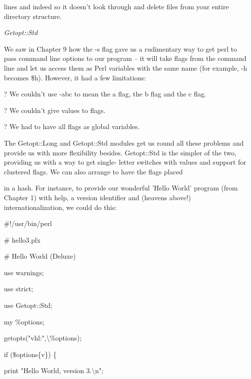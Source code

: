 \documentclass[a4paper,11pt]{book}
\begin{document}
\noindent lines and indeed so it doesn't look through and delete files from your entire directory structure.

\noindent 

\noindent 

\noindent \textit{Getopt::Std}

\noindent We saw in Chapter 9 how the -s flag gave us a rudimentary way to get perl to pass command line options to our program -- it will take flags from the command line and let us access them as Perl variables with the same name (for example, -h becomes \$h). However, it had a few limitations:

\noindent 

\noindent ? We couldn't use -abc to mean the a flag, the b flag and the c flag.

\noindent 

\noindent ? We couldn't give values to flags.

\noindent 

\noindent ? We had to have all flags as global variables.

\noindent 

\noindent The Getopt::Long and Getopt::Std modules get us round all these problems and provide us with more flexibility besides. Getopt::Std is the simpler of the two, providing us with a way to get single- letter switches with values and support for clustered flags. We can also arrange to have the flags placed

\noindent in a hash. For instance, to provide our wonderful 'Hello World' program (from Chapter 1) with help, a version identifier and (heavens above!) internationalization, we could do this:

\noindent 

\noindent \#!/usr/bin/perl

\noindent \# hello3.plx

\noindent \# Hello World (Deluxe)

\noindent use warnings;

\noindent use strict;

\noindent 

\noindent use Getopt::Std;

\noindent my \%options;

\noindent getopts("vhl:",\textbackslash \%options);

\noindent 

\noindent if (\$options\{v\}) \{

\noindent print "Hello World, version 3.\textbackslash n";
\end{document}

